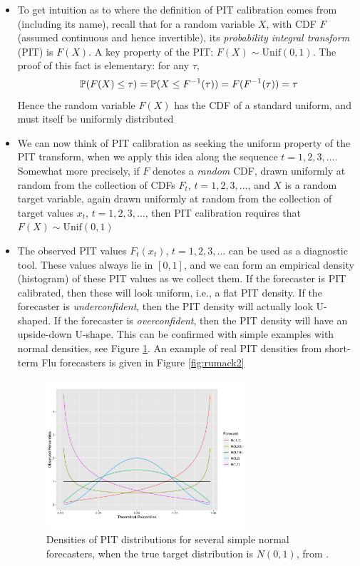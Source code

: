 \documentclass{article}
\begin{document}
\begin{itemize}
\item To get intuition as to where the definition of PIT calibration comes from 
  (including its name), recall that for a random variable $X$, with CDF $F$
  (assumed continuous and hence invertible), its \emph{probability integral
    transform} (PIT) is $F(X)$. A key property of the PIT: $F(X) \sim
  \mathrm{Unif}(0,1)$. The proof of this fact is elementary: for any $\tau$, 
  \[
  \P(F(X) \leq \tau) = \P(X \leq F^{-1}(\tau)) = F(F^{-1}(\tau)) = \tau
  \]
  Hence the random variable $F(X)$ has the CDF of a standard uniform, and must
  itself be uniformly distributed 

\item We can now think of PIT calibration as seeking the uniform property of 
  the PIT transform, when we apply this idea along the sequence $t =
  1,2,3,\dots$. Somewhat more precisely, if $F$ denotes a \emph{random} CDF, 
  drawn uniformly at random from the collection of CDFs $F_t$, $t =
  1,2,3,\dots$, and $X$ is a random target variable, again drawn uniformly at
  random from the collection of target values $x_t$, $t = 1,2,3,\dots$, then PIT
  calibration requires that $F(X) \sim \mathrm{Unif}(0,1)$   

\item The observed PIT values $F_t(x_t)$, $t = 1,2,3,\dots$ can be used as a
  diagnostic tool. These values always lie in $[0,1]$, and we can form an
  empirical density (histogram) of these PIT values as we collect them. If the 
  forecaster is PIT calibrated, then these will look uniform, i.e., a flat PIT
  density. If the forecaster is \emph{underconfident}, then the PIT density will
  actually look U-shaped. If the forecaster is \emph{overconfident}, then the
  PIT density will have an upside-down U-shape. This can be confirmed with
  simple examples with normal densities, see Figure \ref{fig:rumack1}. An
  example of real PIT densities from short-term Flu forecasters is given in
  Figure \ref{fig:rumack2} 

\begin{figure}[p]
\centering
\includegraphics[width=0.7\textwidth]{rumack1.png}
\vspace{-15pt}
\caption{Densities of PIT distributions for several simple normal forecasters,
  when the true target distribution is $N(0,1)$, from
  \citet{rumack2022recalibrating}.}  
\label{fig:rumack1}   


\end{figure}
\end{itemize}
\end{document}

